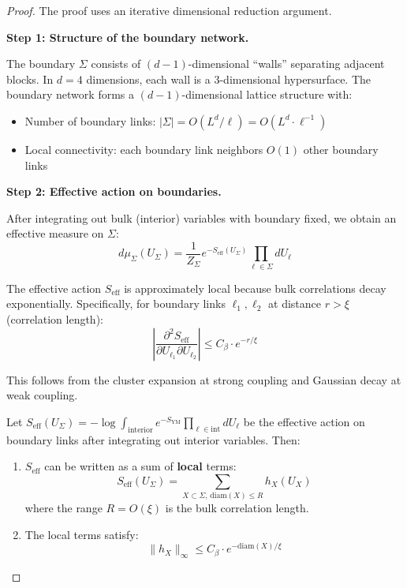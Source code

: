 \begin{proof}
The proof uses an iterative dimensional reduction argument.

\textbf{Step 1: Structure of the boundary network.}

The boundary $\Sigma$ consists of $(d-1)$-dimensional ``walls'' separating 
adjacent blocks. In $d = 4$ dimensions, each wall is a 3-dimensional hypersurface.
The boundary network forms a $(d-1)$-dimensional lattice structure with:
\begin{itemize}
\item Number of boundary links: $|\Sigma| = O(L^d / \ell) = O(L^d \cdot \ell^{-1})$
\item Local connectivity: each boundary link neighbors $O(1)$ other boundary links
\end{itemize}

\textbf{Step 2: Effective action on boundaries.}

After integrating out bulk (interior) variables with boundary fixed, we obtain 
an effective measure on $\Sigma$:
\[
d\mu_\Sigma(U_\Sigma) = \frac{1}{Z_\Sigma} e^{-S_{\mathrm{eff}}(U_\Sigma)} \prod_{\ell \in \Sigma} dU_\ell
\]

The effective action $S_{\mathrm{eff}}$ is approximately local because bulk 
correlations decay exponentially. Specifically, for boundary links $\ell_1, \ell_2$ 
at distance $r > \xi$ (correlation length):
\[
\left| \frac{\partial^2 S_{\mathrm{eff}}}{\partial U_{\ell_1} \partial U_{\ell_2}} \right| 
\leq C_\beta \cdot e^{-r/\xi}
\]

This follows from the cluster expansion at strong coupling and Gaussian decay 
at weak coupling.

\begin{lemma}
\label{lem:effective-locality}
Let $S_{\mathrm{eff}}(U_\Sigma) = -\log \int_{\mathrm{interior}} e^{-S_{\mathrm{YM}}} \prod_{\ell \in \mathrm{int}} dU_\ell$
be the effective action on boundary links after integrating out interior variables.
Then:
\begin{enumerate}[label=(\roman*)]
\item $S_{\mathrm{eff}}$ can be written as a sum of \textbf{local} terms:
\[
S_{\mathrm{eff}}(U_\Sigma) = \sum_{X \subset \Sigma, \, \mathrm{diam}(X) \leq R} h_X(U_X)
\]
where the range $R = O(\xi)$ is the bulk correlation length.

\item The local terms satisfy:
\[
\|h_X\|_\infty \leq C_\beta \cdot e^{-\mathrm{diam}(X)/\xi}
\]


\end{enumerate}
\end{lemma}
\end{proof}
